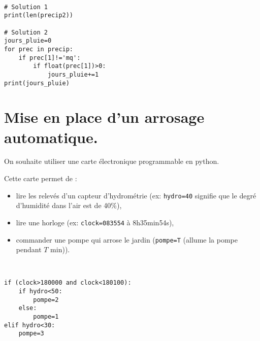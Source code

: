 
\begin{solution}~\ \\
\begin{verbatim}
# Solution 1
print(len(precip2))

# Solution 2
jours_pluie=0
for prec in precip:
    if prec[1]!='mq':
        if float(prec[1])>0:
            jours_pluie+=1
print(jours_pluie)
\end{verbatim}
\end{solution}

\section{Mise en place d'un arrosage automatique.}

On souhaite utiliser une carte électronique programmable en python.

Cette carte permet de :
\begin{itemize}
 \item lire les relevés d'un capteur d'hydrométrie (ex: \verb?hydro=40? signifie que le degré d'humidité dans l'air est de 40\%),
 \item lire une horloge (ex: \verb?clock=083554? à 8h35min54s),
 \item commander une pompe qui arrose le jardin (\verb?pompe=T? (allume la pompe pendant $T$ min)).
\end{itemize}


\begin{solution}~\ \\
\begin{verbatim}
if (clock>180000 and clock<180100):
    if hydro<50:
        pompe=2
    else:
        pompe=1
elif hydro<30:
    pompe=3
\end{verbatim}
\end{solution}


